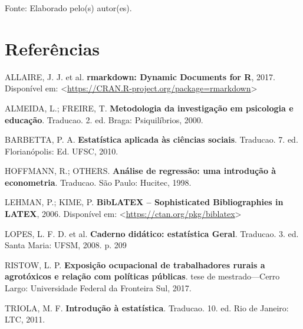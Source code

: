 \documentclass[12pt,brazil,oneside]{book}
\begin{document}
Fonte: Elaborado pelo(s) autor(es).

\hypertarget{referencias}{%
\chapter*{Referências}\label{referencias}}

\hypertarget{refs}{}
\leavevmode\hypertarget{ref-R-rmarkdown}{}%
ALLAIRE, J. J. et al. \textbf{rmarkdown: Dynamic Documents for R}, 2017.
Disponível em:
\textless{}\url{https://CRAN.R-project.org/package=rmarkdown}\textgreater{}

\leavevmode\hypertarget{ref-almeida2000}{}%
ALMEIDA, L.; FREIRE, T. \textbf{Metodologia da investigação em
psicologia e educação}. Traducao. 2. ed. Braga: Psiquilíbrios, 2000.

\leavevmode\hypertarget{ref-barbetta1988}{}%
BARBETTA, P. A. \textbf{Estatística aplicada às ciências sociais}.
Traducao. 7. ed. Florianópolis: Ed. UFSC, 2010.

\leavevmode\hypertarget{ref-hoffmann1998}{}%
HOFFMANN, R.; OTHERS. \textbf{Análise de regressão: uma introdução à
econometria}. Traducao. São Paulo: Hucitec, 1998.

\leavevmode\hypertarget{ref-biblatex}{}%
LEHMAN, P.; KIME, P. \textbf{BibLATEX -- Sophisticated Bibliographies in
LATEX}, 2006. Disponível em:
\textless{}\url{https://ctan.org/pkg/biblatex}\textgreater{}

\leavevmode\hypertarget{ref-lopes2008}{}%
LOPES, L. F. D. et al. \textbf{Caderno didático: estatística Geral}.
Traducao. 3. ed. Santa Maria: UFSM, 2008. p. 209

\leavevmode\hypertarget{ref-Ristow2017}{}%
RISTOW, L. P. \textbf{Exposição ocupacional de trabalhadores rurais a
agrotóxicos e relação com políticas públicas}. tese de mestrado---Cerro
Largo: Universidade Federal da Fronteira Sul, 2017.

\leavevmode\hypertarget{ref-triola1999}{}%
TRIOLA, M. F. \textbf{Introdução à estatística}. Traducao. 10. ed. Rio
de Janeiro: LTC, 2011.
\end{document}
